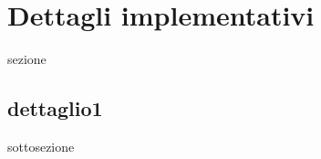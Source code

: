 \section{Dettagli implementativi}\label{sec:dettagli}
\normalsize
sezione
\subsection{dettaglio1}\label{ssec:d1}
\normalsize
sottosezione